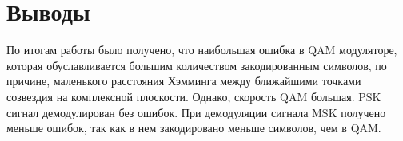 \documentclass[a4paper,14pt]{article}
\begin{document}
\section{Выводы}
\hspace{0,5cm} 
По итогам работы было получено, что наибольшая ошибка в QAM модуляторе, которая обуславливается большим количеством закодированным символов, по причине, маленького расстояния Хэмминга между ближайшими точками созвездия на комплексной плоскости. Однако, скорость QAM большая. PSK сигнал демодулирован без ошибок. При демодуляции сигнала MSK получено меньше ошибок, так как в нем закодировано меньше символов, чем в QAM.
\end{document}
